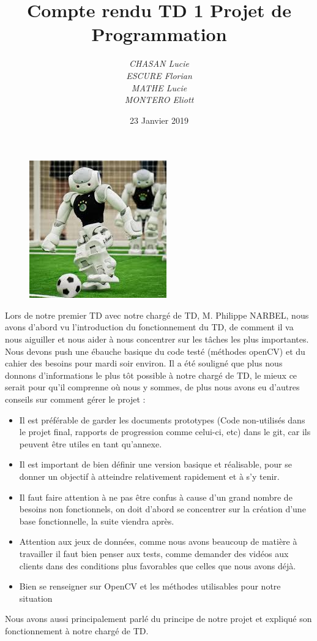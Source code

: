 \documentclass[a4paper,12pt]{report}
\author{ 
\textit{CHASAN Lucie}\\
\textit{ESCURE Florian}\\
\textit{MATHE Lucie}\\
\textit{MONTERO Eliott}\\
}
\title{\textbf{Compte rendu TD 1 Projet de Programmation}}
\date{23 Janvier 2019}
\begin{document}
\begin{figure}[!b] 
\begin{center} 
\href{Copyright 1994 David Farley}{\includegraphics[scale = 1]{robocup.jpg}}
\end{center} 
\end{figure} 
  
\maketitle

\newpage

Lors de notre premier TD avec notre chargé de TD, M. Philippe NARBEL, nous avons d'abord vu l'introduction du fonctionnement du TD, de comment il va nous aiguiller et nous aider à nous concentrer sur les tâches les plus importantes.
\newline
Nous devons push une ébauche basique du code testé (méthodes openCV) et du cahier des besoins pour mardi soir environ.
\newline
Il a été souligné que plus nous donnons d'informations le plus tôt possible à notre chargé de TD, le mieux ce serait pour qu'il comprenne où nous y sommes, de plus nous avons eu d'autres conseils sur comment gérer le projet :
\begin{itemize}
    \item Il est préférable de garder les documents prototypes (Code non-utilisés dans le projet final, rapports de progression comme celui-ci, etc) dans le git, car ils peuvent être utiles en tant qu'annexe.
    \item Il est important de bien définir une version basique et réalisable, pour se donner un objectif à atteindre relativement rapidement et à s'y tenir.
    \item Il faut faire attention à ne pas être confus à cause d'un grand nombre de besoins non fonctionnels, on doit d'abord se concentrer sur la création d'une base fonctionnelle, la suite viendra après.
    \item Attention aux jeux de données, comme nous avons beaucoup de matière à travailler il faut bien penser aux tests, comme demander des vidéos aux clients dans des conditions plus favorables que celles que nous avons déjà.
    \item Bien se renseigner sur OpenCV et les méthodes utilisables pour notre situation
\end{itemize}

\newline
Nous avons aussi principalement parlé du principe de notre projet et expliqué son fonctionnement à notre chargé de TD.
\end{document}
